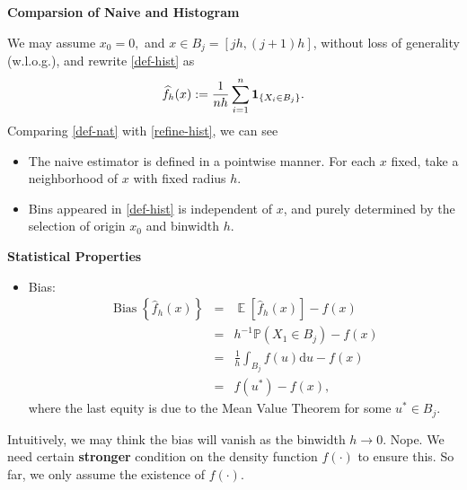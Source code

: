 \documentclass[19pt,landscaoe]{article}
\newcommand{\IP}{\mathbb{P}}
\newcommand{\bone}{{\bf 1}}
\DeclareMathOperator{\E}{\mathbb{E}}
\DeclareMathOperator{\bs}{\mathrm{Bias}}
\begin{document}
\newpage
{\LARGE{\textbf{Comparsion of Naive and Histogram}}}
\vskip25pt
\begin{minipage}{.9\textwidth}
    \Large 
    We may assume  $x_0=0,$ and $x\in B_j=[jh,(j+1)h]$, without loss of generality (w.l.o.g.), and rewrite \eqref{def-hist} as  
    \begin{equation}\label{refine-hist}
        \widehat{f}_h(x):=\frac1{nh}\sum_{i=1}^n\bone_{\{X_i\in B_j\}}.
    \end{equation}
    Comparing \eqref{def-nat} with \eqref{refine-hist}, we can see 
\begin{itemize}
\item The naive estimator is defined in a pointwise manner. For each $x$ fixed, take a neighborhood of $x$ with fixed radius $h$.
\item Bins appeared in \eqref{def-hist} is independent of $x$, and purely determined by the selection of origin $x_0$ and binwidth $h$.
\end{itemize}
\end{minipage}





\newpage
{\LARGE\centerline{\textbf{Statistical Properties}}}
\vskip25pt
\begin{minipage}{.9\textwidth}
    \Large
    \begin{itemize}
        \item Bias: 
        \begin{eqnarray}
            \bs\left\{\widehat{f}_h(x)\right\}&=&\E\left[\widehat{f}_h(x)\right]-f(x)\nonumber\\
            &=&h^{-1}\IP\left(X_1\in B_j\right)-f(x)\nonumber\\
            &=&\frac1h\int_{B_j}f(u)\mathrm{d}u-f(x)\nonumber\\
            &=&f(u^*)-f(x),\label{bs-mvt}
        \end{eqnarray}
        where the last equity is due to the Mean Value Theorem for some $u^*\in B_j$. 
    \end{itemize}
Intuitively, we may think the bias will vanish as the binwidth $h\to0$. Nope. We need certain {\bf stronger} condition on the density function $f(\cdot)$ to ensure this. So far, we only assume the existence of $f(\cdot)$.
\end{minipage}
\end{document}
